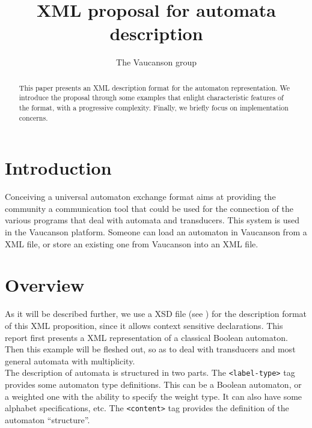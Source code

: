 \documentclass[a4paper]{llncs}
\newcommand{\Vauc}{{\sc Vaucanson}\xspace}
\def\typetag{\texttt{<label-type>}}
\def\contenttag{\texttt{<content>}}
\begin{document}
\title{XML proposal for automata description}

\author{The \Vauc group\inst{}}


\maketitle{}

\begin{abstract}
This paper presents an XML description format for the automaton
representation. We introduce the proposal through some examples that
enlight characteristic features of the format, with a progressive
complexity. Finally, we briefly focus on implementation concerns.
\end{abstract}

\section*{Introduction}

Conceiving a universal automaton exchange format aims at
providing the community a communication tool that could be used
for the connection of the various programs that deal with
automata and transducers.
This system is used in the Vaucanson platform. Someone can load an automaton in
Vaucanson from a XML file, or store an existing one from Vaucanson into an XML file.

\section{Overview}

As it will be described further, we use a XSD file (see \cite{XSD}) for the description
format of this XML proposition, since it allows context sensitive declarations.
This report first presents a XML representation of a classical Boolean
automaton. Then this example will be fleshed out, so as to deal with transducers
and most general automata with multiplicity.\\

The description of automata is structured in two parts.  The
\typetag{} tag provides some automaton type definitions. This can be a Boolean
automaton, or a weighted one with the ability to specify the weight type.
It can also have some alphabet specifications, etc. The \contenttag{} tag provides
the definition of the automaton ``structure''.\\
\end{document}
